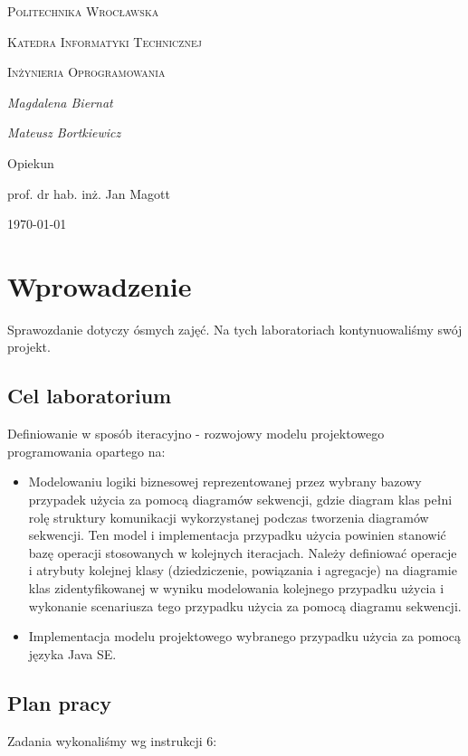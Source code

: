 \documentclass{article}
\begin{document}
	
	\begin{titlepage}
		\centering
		{\scshape\LARGE Politechnika Wrocławska \par}
		{\scshape\Large Katedra Informatyki Technicznej\par}
		
		\vspace{1cm}
		{\scshape\Large Inżynieria Oprogramowania\par}
		\vspace{1.5cm}
		{\huge\bfseries \par}
		\vspace{2cm}
		{\Large\itshape Magdalena Biernat\par}
		{\Large\itshape Mateusz Bortkiewicz\par}
		\vfill
		Opiekun\par
		prof. dr hab. inż. Jan Magott 
		
		\vfill
		{\large \today\par}
	\end{titlepage}
	\newpage
	
	\section{Wprowadzenie}
	Sprawozdanie dotyczy ósmych zajęć. Na tych laboratoriach kontynuowaliśmy swój projekt. 
	
	\subsection{Cel laboratorium}
Definiowanie w sposób iteracyjno - rozwojowy modelu projektowego
programowania opartego na:
\begin{itemize}
\item Modelowaniu logiki biznesowej reprezentowanej przez wybrany
bazowy przypadek użycia za pomocą diagramów sekwencji, gdzie
diagram klas pełni rolę struktury komunikacji wykorzystanej podczas
tworzenia diagramów sekwencji. Ten model i implementacja przypadku
użycia powinien stanowić bazę operacji stosowanych w kolejnych
iteracjach. Należy definiować operacje i atrybuty kolejnej klasy
(dziedziczenie, powiązania i agregacje) na diagramie klas
zidentyfikowanej w wyniku modelowania kolejnego przypadku użycia i
wykonanie scenariusza tego przypadku użycia za pomocą diagramu
sekwencji.
\item Implementacja modelu projektowego wybranego przypadku użycia za
pomocą języka Java SE.
\end{itemize}
	\subsection{Plan pracy}
	Zadania wykonaliśmy wg instrukcji 6:
	
\end{document}
